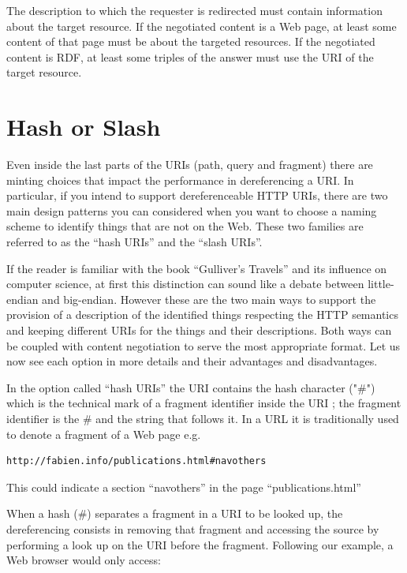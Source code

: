 The description to which the requester is redirected must contain
information about the target resource. If the negotiated content is a
Web page, at least some content of that page must be about the targeted
resources. If the negotiated content is RDF, at least some triples of
the answer must use the URI of the target resource.

\hypertarget{hash-or-slash}{%
\section{Hash or Slash}\label{hash-or-slash}}

Even inside the last parts of the URIs (path, query and
fragment) there are minting choices that impact the performance in
dereferencing a URI. In particular, if you intend to support
dereferenceable HTTP URIs, there are two main design patterns you can 
considered when you want to choose a naming scheme to identify
things that are not on the Web. These two families are referred to as
the ``hash URIs'' and the ``slash URIs''.  


If the reader is familiar with the book ``Gulliver's Travels'' and its
influence on computer science, at first this distinction can sound like
a debate between little-endian and big-endian. However these are the two
main ways to support the provision of a description of the identified
things respecting the HTTP semantics and keeping different URIs for the
things and their descriptions. Both ways can be coupled with content
negotiation to serve the most appropriate format. Let us now see each
option in more details and their advantages and disadvantages.

In the option called ``hash URIs'' the URI contains the hash character
("\#") which is the technical mark of a fragment identifier inside the
URI ; the fragment identifier is the \# and the string that follows it.
In a URL it is traditionally used to denote a fragment of a Web page
e.g.

\begin{lstlisting}
http://fabien.info/publications.html#navothers
\end{lstlisting}

This could indicate a section ``navothers'' in the page
``publications.html''

When a hash (\#) separates a fragment in a URI to be looked up, the
dereferencing consists in removing that fragment and accessing the
source by performing a look up on the URI before the fragment. Following
our example, a Web browser would only access:

